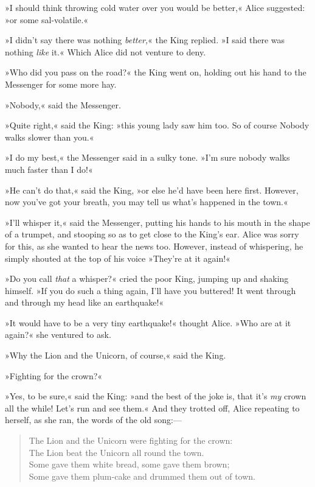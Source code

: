 »I should think throwing cold water over you would be better,« Alice suggested: »or some sal-volatile.«

»I didn't say there was nothing \textit{better,}« the King replied. »I said there was nothing \textit{like} it.« Which Alice did not venture to deny.

»Who did you pass on the road?« the King went on, holding out his hand to the Messenger for some more hay.

»Nobody,« said the Messenger.

»Quite right,« said the King: »this young lady saw him too. So of course Nobody walks slower than you.«

»I do my best,« the Messenger said in a sulky tone. »I'm sure nobody walks much faster than I do!«

»He can't do that,« said the King, »or else he'd have been here first. However, now you've got your breath, you may tell us what's happened in the town.«

»I'll whisper it,« said the Messenger, putting his hands to his mouth in the shape of a trumpet, and stooping so as to get close to the King's ear. Alice was sorry for this, as she wanted to hear the news too. However, instead of whispering, he simply shouted at the top of his voice »They're at it again!«

»Do you call \textit{that} a whisper?« cried the poor King, jumping up and shaking himself. »If you do such a thing again, I'll have you buttered! It went through and through my head like an earthquake!«

»It would have to be a very tiny earthquake!« thought Alice. »Who are at it again?« she ventured to ask.

»Why the Lion and the Unicorn, of course,« said the King.

»Fighting for the crown?«

»Yes, to be sure,« said the King: »and the best of the joke is, that it's \textit{my} crown all the while! Let's run and see them.« And they trotted off, Alice repeating to herself, as she ran, the words of the old song:—

\begin{verse}
The Lion and the Unicorn were fighting for the crown:\\
\vin The Lion beat the Unicorn all round the town.\\
Some gave them white bread, some gave them brown;\\
\vin Some gave them plum-cake and drummed them out of town.
\end{verse}

